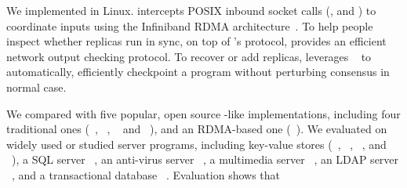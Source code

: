 


We implemented \xxx in Linux. \xxx intercepts POSIX inbound socket calls
(\eg, \accept and \recv) to coordinate inputs using the Infiniband
RDMA architecture~\cite{infiniband}. To help people inspect whether replicas 
run in sync, on top of \xxx's \paxos protocol, \xxx provides an efficient 
network output checking protocol. To recover or add replicas, \xxx 
leverages \criu~\cite{criu} to automatically, efficiently checkpoint a program 
without perturbing consensus in normal case.


We compared \xxx with five popular, open source \paxos-like implementations,
including four traditional ones (\libpaxos~\cite{libpaxos},
\zookeeper~\cite{zookeeper}, \crane~\cite{crane:sosp15} and
\spaxos~\cite{spaxos:srds12}), and an RDMA-based one 
(\dare~\cite{dare:hpdc15}). We evaluated \xxx on \nprog widely used or studied 
server programs, including
\nkvprog key-value stores (\redis~\cite{redis}, \memcached~\cite{memcached},
\ssdb~\cite{ssdb}, and \mongodb~\cite{mongodb}), a SQL server
\mysql~\cite{mysql}, an anti-virus server \clamav~\cite{clamav}, a multimedia
server \mediatomb~\cite{mediatomb}, an LDAP server \openldap~\cite{openldap}, 
and a transactional database \calvin~\cite{calvin:sigmod12}. Evaluation shows 
that

